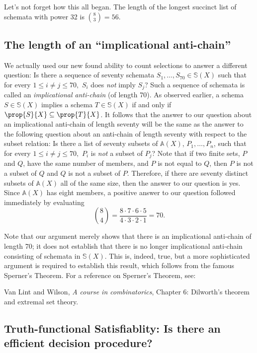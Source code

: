 Let's not forget how this all began. The length of the longest succinct list of schemata with power 32 is $\binom{8}{3}=56$.

\subsection{The length of an ``implicational anti-chain''}

We actually used our new found ability to count selections to answer a different question: Is there a sequence of seventy schemata $S_1,\ldots,S_{70}\in\mathbb{S}(X)$ such that for every $1\leq i\neq j\leq 70,$ $S_i$ does \emph{not} imply $S_j$? Such a sequence of schemata is called an \emph{implicational anti-chain} (of length 70).
As observed earlier, a schema $S\in\mathbb{S}(X)$ implies a schema $T\in\mathbb{S}(X)$ if and only if $\prop{S}{X}\subseteq\prop{T}{X}$. It follows that the answer to our question about an implicational anti-chain of length seventy will be the same as the answer to the following question about an anti-chain of length seventy with respect to the subset relation: Is there a list of seventy subsets of $\mathbb{A}(X)$, $P_1,\ldots,P_n$, such that for every $1\leq i\neq j\leq 70,$ $P_i$ is \emph{not} a subset of $P_j$? Note that if two finite sets, $P$ and $Q$, have the same number of members, and $P$ is not equal to $Q$, then $P$ is not a subset of $Q$ and $Q$ is not a subset of $P$. Therefore, if there are seventy distinct subsets of $\mathbb{A}(X)$ all of the same size, then the answer to our question is yes. Since $\mathbb{A}(X)$ has eight members, a positive answer to our question followed immediately by evaluating 
\[
\binom{8}{4}= \frac{8\cdot7\cdot6\cdot5}{4\cdot3\cdot2\cdot1}=70.
\] 

Note that our argument merely shows that there is an implicational anti-chain of length 70; it does not establish that there is no longer implicational anti-chain consisting of schemata in $\mathbb{S}(X)$. This is, indeed, true, but a more sophisticated argument is required to establish this result, which follows from the famous Sperner's Theorem. For a reference on Sperner's Theorem, see: 

Van Lint and Wilson, \emph{A course in combinatorics}, Chapter 6: Dilworth's theorem and extremal set theory.

\subsection{Truth-functional Satisfiablity: Is there an efficient decision procedure?}

